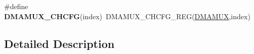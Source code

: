 \begin{DoxyCompactItemize}
\item 
\#define {\bfseries D\+M\+A\+M\+U\+X\+\_\+\+C\+H\+C\+FG}(index)~D\+M\+A\+M\+U\+X\+\_\+\+C\+H\+C\+F\+G\+\_\+\+R\+EG(\hyperlink{group__DMAMUX__Peripheral__Access__Layer_ga0b7b7bd666a76aa791434bb59ea03693}{D\+M\+A\+M\+UX},index)\hypertarget{group__DMAMUX__Register__Accessor__Macros_ga24144399d19b87f041caf1fc3d556faf}{}\label{group__DMAMUX__Register__Accessor__Macros_ga24144399d19b87f041caf1fc3d556faf}

\end{DoxyCompactItemize}


\subsection{Detailed Description}
